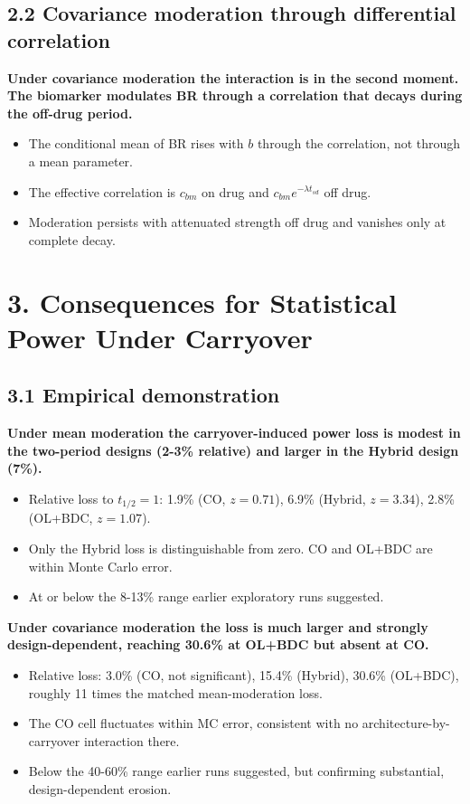 \documentclass[
  11pt,
]{article}
\begin{document}
\subsection{2.2 Covariance moderation through differential correlation}

\textbf{Under covariance moderation the interaction is in the
second moment. The biomarker modulates BR through a correlation
that decays during the off-drug period.}

\begin{itemize}\setlength{\itemsep}{2pt}\setlength{\parskip}{0pt}
\item The conditional mean of BR rises with $b$ through the
correlation, not through a mean parameter.
\item The effective correlation is $c_{bm}$ on drug and $c_{bm}
e^{-\lambda t_{sd}}$ off drug.
\item Moderation persists with attenuated strength off drug and
vanishes only at complete decay.
\end{itemize}

\section{3. Consequences for Statistical Power Under Carryover}

\subsection{3.1 Empirical demonstration}

\textbf{Under mean moderation the carryover-induced power loss is
modest in the two-period designs (2-3\% relative) and larger in the
Hybrid design (7\%).}

\begin{itemize}\setlength{\itemsep}{2pt}\setlength{\parskip}{0pt}
\item Relative loss to $t_{1/2} = 1$: 1.9\% (CO, $z = 0.71$),
6.9\% (Hybrid, $z = 3.34$), 2.8\% (OL+BDC, $z = 1.07$).
\item Only the Hybrid loss is distinguishable from zero. CO and
OL+BDC are within Monte Carlo error.
\item At or below the 8-13\% range earlier exploratory runs
suggested.
\end{itemize}

\textbf{Under covariance moderation the loss is much larger and strongly
design-dependent, reaching 30.6\% at OL+BDC but absent at CO.}

\begin{itemize}\setlength{\itemsep}{2pt}\setlength{\parskip}{0pt}
\item Relative loss: 3.0\% (CO, not significant), 15.4\% (Hybrid),
30.6\% (OL+BDC), roughly 11 times the matched
mean-moderation loss.
\item The CO cell fluctuates within MC error, consistent with no
architecture-by-carryover interaction there.
\item Below the 40-60\% range earlier runs suggested, but confirming
substantial, design-dependent erosion.
\end{itemize}
\end{document}

